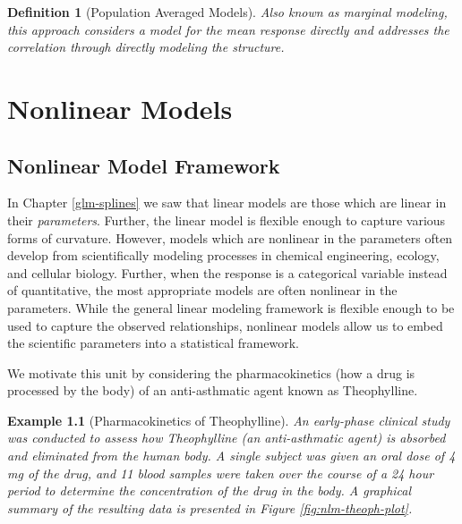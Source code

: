 \documentclass[
]{book}
\theoremstyle{plain}
\theoremstyle{mydefn}
\newtheorem{definition}{Definition}[chapter]
\theoremstyle{myexmpl}
\newtheorem{example}{Example}[chapter]
\theoremstyle{remark}
\begin{document}
\begin{definition}[Population Averaged Models]
Also known as marginal modeling, this approach considers a model for the mean response directly and addresses the correlation through directly modeling the structure.
\end{definition}

\hypertarget{part-nonlinear-models}{%
\part{Nonlinear Models}\label{part-nonlinear-models}}

\hypertarget{nlm-framework}{%
\chapter{Nonlinear Model Framework}\label{nlm-framework}}

In Chapter \ref{glm-splines} we saw that linear models are those which are linear in their \emph{parameters}. Further, the linear model is flexible enough to capture various forms of curvature. However, models which are nonlinear in the parameters often develop from scientifically modeling processes in chemical engineering, ecology, and cellular biology. Further, when the response is a categorical variable instead of quantitative, the most appropriate models are often nonlinear in the parameters. While the general linear modeling framework is flexible enough to be used to capture the observed relationships, nonlinear models allow us to embed the scientific parameters into a statistical framework.

We motivate this unit by considering the pharmacokinetics (how a drug is processed by the body) of an anti-asthmatic agent known as Theophylline.

\begin{example}[Pharmacokinetics of Theophylline]
An early-phase clinical study was conducted to assess how Theophylline (an anti-asthmatic agent) is absorbed and eliminated from the human body. A single subject was given an oral dose of 4 mg of the drug, and 11 blood samples were taken over the course of a 24 hour period to determine the concentration of the drug in the body. A graphical summary of the resulting data is presented in Figure \ref{fig:nlm-theoph-plot}.
\end{example}
\end{document}
